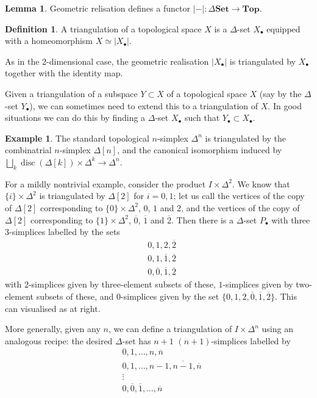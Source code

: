 \documentclass{tufte-handout}
\def\Set {\mathbf{Set}}
\def\Top {\mathbf{Top}}
\DeclareMathOperator{\disc}{disc}
\theoremstyle{definition}
\newtheorem{lemma}{Lemma}
\newtheorem{definition}{Definition}
\newtheorem{example}{Example}
\begin{document}
\begin{lemma}
Geometric relisation defines a functor $|-|\colon \Delta\Set \to \Top$.
\end{lemma}


\begin{definition}
A triangulation of a topological space $X$ is a $\Delta$-set $X_\bullet$ equipped with a 
homeomorphism $X\simeq |X_\bullet|$.
\end{definition}

As in the 2-dimensional case, the geometric realisation $|X_\bullet|$ is triangulated by
$X_\bullet$ together with the identity map.

Given a triangulation of a subspace $Y\subset X$ of a topological space $X$ (say by the $\Delta$-set $Y_\bullet$), we
can sometimes need to extend this to a triangulation of $X$. In good situations we can do this
by finding a $\Delta$-set $X_\bullet$ such that $Y_\bullet \subset X_\bullet$.


\begin{example}
The standard topological $n$-simplex $\Delta^n$ is triangulated by the combinatrial $n$-simplex
$\Delta[n]$, and the canonical isomorphism induced by $\bigsqcup_k \disc(\Delta[k])\times \Delta^k\to \Delta^n$.
\end{example}

For a mildly nontrivial example, consider the product $I\times \Delta^2$. We know that 
$\{i\}\times \Delta^2$ is triangulated by $\Delta[2]$ for $i=0,1$; let us call the vertices
of the copy of $\Delta[2]$ corresponding to $\{0\}\times \Delta^2$, $0$, $1$ and $2$, and the
vertices of the copy of $\Delta[2]$ corresponding to $\{1\}\times \Delta^2$, $\overline{0}$, 
$\overline{1}$ and $\overline{2}$. Then there is a $\Delta$-set $P_\bullet$ with three $3$-simplices 
labelled by the sets 
\begin{align*}
& 0,1,2,\overline{2}\\
& 0,1,\overline{1},\overline{2}\\
& 0,\overline{0},\overline{1},\overline{2}
\end{align*}
with $2$-simplices given by three-element subsets of these, $1$-simplices given by two-element
subsets of these, and $0$-simplices given by the set 
$\{0,1,2,\overline{0},\overline{1},\overline{2}\}$. This can visualised as at right.

More generally, given any $n$, we can define a triangulation of $I\times \Delta^n$ using an 
analogous recipe: the desired $\Delta$-set has $n+1$ $(n+1)$-simplices labelled by
\begin{align*}
& 0,1,\ldots, n,\overline{n}\\
& 0,1,\ldots,n-1,\overline{n-1},\overline{n}\\
&\vdots\\
& 0,\overline{0},\overline{1},\ldots,\overline{n}\\
\end{align*}
\end{document}
